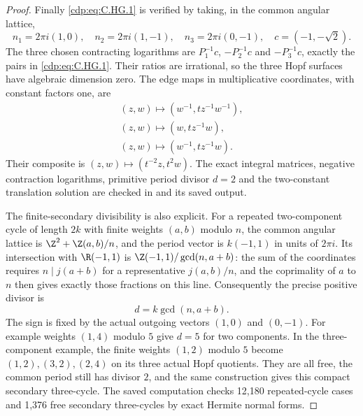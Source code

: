 \begin{proof}
Finally \eqref{cdp:eq:C.HG.1} is verified by taking,
in the common angular lattice,
\[
 n_1=2\pi i(1,0),\quad
 n_2=2\pi i(1,-1),\quad
 n_3=2\pi i(0,-1),\quad
 c=(-1,-\sqrt2).
\tag{C.HG.15}\label{cdp:eq:C.HG.15}
\]
The three chosen contracting logarithms
are $P_1^{-1}c$, $-P_2^{-1}c$ and
$-P_3^{-1}c$, exactly the pairs in
\eqref{cdp:eq:C.HG.1}. Their ratios are irrational,
so the three Hopf surfaces have
algebraic dimension zero. The edge
maps in multiplicative coordinates,
with constant factors one, are
\[
 \begin{gathered}
 (z,w)\mapsto(w^{-1},t z^{-1}w^{-1}),\\
 (z,w)\mapsto(w,t z^{-1}w),\\
 (z,w)\mapsto(w^{-1},t z^{-1}w).
 \end{gathered}
\tag{C.HG.16}\label{cdp:eq:C.HG.16}
\]
Their composite is $(z,w)\mapsto(t^{-2}z,t^2w)$.
The exact integral matrices, negative
contraction logarithms, primitive
period divisor $d=2$ and the two-constant
translation solution are checked in
and its saved output.

The finite-secondary divisibility is also
explicit. For a repeated two-component
cycle of length $2k$ with finite weights
$(a,b)$ modulo $n$, the common angular
lattice is
$\Z^2+\Z(a,b)/n$, and the period vector is
$k(-1,1)$ in units of $2\pi i$.
Its intersection with $\R(-1,1)$ is
$\Z(-1,1)/\gcd(n,a+b)$: the sum of the
coordinates requires $n\mid j(a+b)$ for
a representative $j(a,b)/n$, and the
coprimality of $a$ to $n$ then gives
exactly those fractions on this line.
Consequently the precise positive divisor is
\[
                    d=k\gcd(n,a+b).
\tag{C.HG.17}\label{cdp:eq:C.HG.17}
\]
The sign is fixed by the actual outgoing
vectors $(1,0)$ and $(0,-1)$.
For example weights $(1,4)$ modulo $5$
give $d=5$ for two components.
In the three-component example, the
finite weights $(1,2)$ modulo $5$ become
$(1,2),(3,2),(2,4)$ on its three actual
Hopf quotients. They are all free, the
common period still has divisor $2$,
and the same construction gives this
compact secondary three-cycle.
The saved computation checks 12,180
repeated-cycle cases and 1,376 free
secondary three-cycles by exact
Hermite normal forms.
\end{proof}


